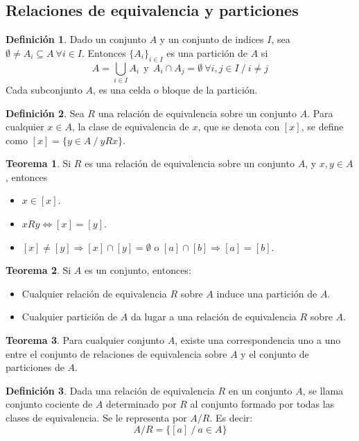 \documentclass[10pt]{article}
\theoremstyle{definition}
\newtheorem{definition}{Definición}[section]
\newtheorem{theorem}{Teorema}[section]
\begin{document}
\subsection{Relaciones de equivalencia y particiones}
\begin{definition}
	Dado un conjunto $A$ y un conjunto de indices $I$, sea $\emptyset\neq A_i \subseteq A\ \forall i\in I$. Entonces $\{A_i\}_{i\in I}$ es una partición de $A$ si $$A=\bigcup _{i\in I} A_{i} \ \ \text{y} \ \ A_{i} \cap A_{j} =\emptyset \ \forall i,j\in I\ /\ i\neq j$$
	Cada subconjunto $A$, es una celda o bloque de la partición.
\end{definition}
\begin{definition}
	Sea $R$ una relación de equivalencia sobre un conjunto $A$. Para cualquier $x\in A$, la clase de equivalencia de $x$, que se denota con $[x]$, se define como $[x]=\{y\in A\ /\ yRx\}$.
\end{definition}
\begin{theorem}
	Si $R$ es una relación de equivalencia sobre un conjunto $A$, y $x,y\in A$, entonces
	\begin{itemize}
		\item $x\in [x]$.
		\item $xRy \Leftrightarrow [x]=[y]$.
		\item $[x]\neq[y]\Rightarrow [x]\cap[y]=\emptyset$ o $[a]\cap[b]\Rightarrow [a]=[b]$.
	\end{itemize}
\end{theorem}
\begin{theorem}
	Si $A$ es un conjunto, entonces:
	\begin{itemize}
		\item Cualquier relación de equivalencia $R$ sobre $A$ induce una partición de $A$.
		\item Cualquier partición de $A$ da lugar a una relación de equivalencia $R$ sobre $A$.
	\end{itemize}
\end{theorem}
\begin{theorem}
	Para cualquier conjunto $A$, existe una correspondencia uno a uno entre el conjunto de relaciones de equivalencia sobre $A$ y el conjunto de particiones de $A$.
\end{theorem}
\begin{definition}
	Dada una relación de equivalencia $R$ en un conjunto $A$, se llama conjunto cociente de $A$ determinado por $R$ al conjunto formado por todas las clases de equivalencia. Se le representa por $A/R$. Es decir:$$A/R=\{[a] \ /\ a\in A\}$$
\end{definition}
\end{document}
